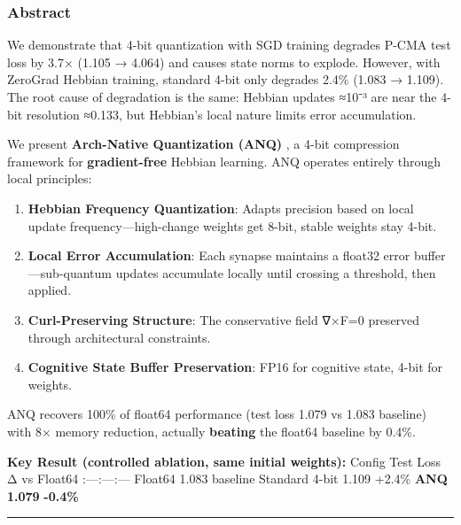 \documentclass[
  11pt,
  a4paper,
]{article}
\begin{document}
\subsubsection{Abstract}\label{abstract}

We demonstrate that 4-bit quantization with SGD training degrades P-CMA
test loss by 3.7× (1.105 → 4.064) and causes state norms to explode.
However, with ZeroGrad Hebbian training, standard 4-bit only degrades
2.4\% (1.083 → 1.109). The root cause of degradation is the same:
Hebbian updates ≈10⁻³ are near the 4-bit resolution ≈0.133, but
Hebbian's local nature limits error accumulation.

We present \textbf{Arch-Native Quantization (ANQ)} , a 4-bit compression
framework for \textbf{gradient-free} Hebbian learning. ANQ operates
entirely through local principles:

\begin{enumerate}
\def\labelenumi{\arabic{enumi}.}
\item
  \textbf{Hebbian Frequency Quantization}: Adapts precision based on
  local update frequency---high-change weights get 8-bit, stable weights
  stay 4-bit.
\item
  \textbf{Local Error Accumulation}: Each synapse maintains a float32
  error buffer---sub-quantum updates accumulate locally until crossing a
  threshold, then applied.
\item
  \textbf{Curl-Preserving Structure}: The conservative field ∇×F=0
  preserved through architectural constraints.
\item
  \textbf{Cognitive State Buffer Preservation}: FP16 for cognitive
  state, 4-bit for weights.
\end{enumerate}

ANQ recovers 100\% of float64 performance (test loss 1.079 vs 1.083
baseline) with 8× memory reduction, actually \textbf{beating} the
float64 baseline by 0.4\%.

\textbf{Key Result (controlled ablation, same initial weights):}
\textbar{} Config \textbar{} Test Loss \textbar{} Δ vs Float64
\textbar{} \textbar:---\textbar:---\textbar:---\textbar{} \textbar{}
Float64 \textbar{} 1.083 \textbar{} baseline \textbar{} \textbar{}
Standard 4-bit \textbar{} 1.109 \textbar{} +2.4\% \textbar{} \textbar{}
\textbf{ANQ} \textbar{} \textbf{1.079} \textbar{} \textbf{-0.4\%}
\textbar{}

\begin{center}\rule{0.5\linewidth}{0.5pt}\end{center}
\end{document}
